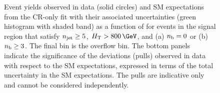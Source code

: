 \begin{figure}[!tbhp]
  \begin{center}
  \end{center}
  \caption{Event yields observed in data (solid circles) and SM
    expectations from the CR-only fit with their associated
    uncertainties (green histogram with shaded band) as a function of
    \mht for events in the signal region that satisfy $n_{\text{jet}} \geq
    5$, $\scalht > 800\,\GeV$, and (a) $n_{\mathrm{b}} = 0$ or (b) $n_{\mathrm{b}} \geq
    3$. The final bin is the overflow bin. The bottom panels indicate
    the significance of the deviations (pulls) observed in data with respect
    to the SM expectations, expressed in terms of the total
    uncertainty in the SM expectations. The pulls are indicative only
    and cannot be considered independently.  
    \label{fig:mht-templates} 
  }
\end{figure}

